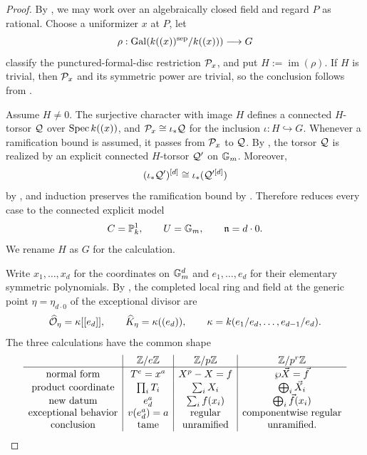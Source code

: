 \begin{proof}
By , we may work over an
algebraically closed field and regard $P$ as rational. Choose a uniformizer
$x$ at $P$, let
\[
    \rho:\operatorname{Gal}(k((x))^{\mathrm{sep}}/k((x)))\longrightarrow G
\]
classify the punctured-formal-disc restriction $\mathcal{P}_x$, and put
$H:=\operatorname{im}(\rho)$. If $H$ is trivial, then $\mathcal{P}_x$ and its
symmetric power are trivial, so the conclusion follows from
.

Assume $H\neq0$. The surjective character with image $H$ defines a connected
$H$-torsor $\mathcal{Q}$ over $\operatorname{Spec} k((x))$, and
$\mathcal{P}_x\cong\iota_*\mathcal{Q}$ for the inclusion $\iota:H\hookrightarrow G$.
Whenever a ramification bound is assumed, it passes from $\mathcal{P}_x$ to $\mathcal{Q}$.
By
, the torsor $\mathcal{Q}$ is realized by an explicit
connected $H$-torsor $\mathcal{Q}'$ on $\mathbb{G}_m$. Moreover,
\[
    (\iota_*\mathcal{Q}')^{[d]}
       \cong\iota_*(\mathcal{Q}'^{[d]})
\]
by , and induction preserves the
ramification bound by . Therefore
 reduces every case to the connected explicit model
\[
    C=\mathbb{P}^1_k,\qquad U=\mathbb{G}_m,\qquad \mathfrak{n}=d\cdot0.
\]
We rename $H$ as $G$ for the calculation.

Write $x_1,\dots,x_d$ for the coordinates on $\mathbb{G}_m^d$ and
$e_1,\dots,e_d$ for their elementary symmetric polynomials. By
, the completed local ring and field at
the generic point $\eta=\eta_{d\cdot0}$ of the exceptional divisor are
\begin{equation}\label{eq:complete_field_at_generic_point}
    \widehat{\mathcal{O}}_\eta=\kappa[[e_d]],\qquad
    \widehat K_\eta=\kappa((e_d)),\qquad
    \kappa=k(e_1/e_d,\dots,e_{d-1}/e_d).
\end{equation}
The three calculations have the common shape
\[
\begin{array}{c|c|c|c}
 &\mathbb{Z}/e\mathbb{Z}&\mathbb{Z}/p\mathbb{Z}&\mathbb{Z}/p^r\mathbb{Z}\\ \hline
\text{normal form}&T^e=x^a&X^p-X=f&\wp\vec X=\vec f\\
\text{product coordinate}&\prod_iT_i&\sum_iX_i&\bigoplus_i\vec X_i\\
\text{new datum}&e_d^a&\sum_i f(x_i)&\bigoplus_i\vec f(x_i)\\
\text{exceptional behavior}&v(e_d^a)=a&\text{regular}&
    \text{componentwise regular}\\
\text{conclusion}&\text{tame}&\text{unramified}&\text{unramified}.
\end{array}
\]


\end{proof}
